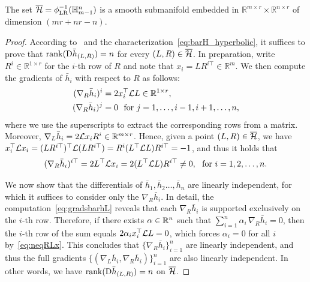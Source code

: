 \begin{proposition}\label{pro:manifold_hyperbolic}
     The set $\overline{\mathcal{H}} = \phi_{\mathrm{LR}}^{-1}(\mathbb{H}^n_{m-1})$ is a smooth submanifold embedded in $\mathbb{R}^{m\times r}\times\mathbb{R}^{n\times r}$ of dimension $(mr+nr-n)$.
\end{proposition}
\begin{proof}
    According to~\cite[Corollary 5.14]{lee2012manifolds} and the characterization~\eqref{eq:barH_hyperbolic}, it suffices to prove that $\operatorname{rank}(\mathrm{D}\bar{h}_{(L,R)})=n$ for every $(L,R)\in\overline{\mathcal{H}}$. In preparation, write $R^i\in\mathbb{R}^{1\times r}$ for the $i$-th row of $R$ and note that $x_i=LR^{i\top}\in\mathbb{R}^m$. We then compute the gradients of $\bar{h}_i$ with respect to $R$ as follows:
    \begin{equation}\label{eq:gradsbarhL}
    \begin{aligned}
        (\nabla_R \bar{h}_i)^{i}&= 2x_i^\top \lanifold L \in\mathbb{R}^{1\times r}, 
        \\
        (\nabla_R \bar{h}_i)^{j} &= 0\ \ \text{for}\ j=1,\ldots,i-1,i+1,\ldots,n,
    \end{aligned}
    \end{equation}
    where we use the superscripts to extract the corresponding rows from a matrix. Moreover, $\nabla_L \bar{h}_i = 2\mathcal{L} x_i R^i \in \mathbb{R}^{m\times r}$. Hence, given a point $(L,R)\in\overline{\mathcal{H}}$, we have $x_i^\top \mathcal{L} x_i
    = (LR^{i\top})^\top \mathcal{L} (LR^{i\top})
    = R^i(L^\top \mathcal{L} L) R^{i\top}
    = -1$, and thus it holds that 
    \begin{equation}\label{eq:neqRLx}
    (\nabla_R \bar{h}_i)^{i\top} = 2L^\top \mathcal{L} x_i= 2(L^\top \mathcal{L} L)R^{i\top}\neq 0,\ \ \text{for}\ i=1,2,\ldots,n.
    \end{equation}

    We now show that the differentials of $\bar{h}_1,\bar{h}_2\dots,\bar{h}_n$ are linearly independent, for which it suffices to consider only the $\nabla_R \bar{h}_i$. In detail, the computation~\eqref{eq:gradsbarhL} reveals that each $\nabla_R \bar{h}_i$ is supported exclusively on the $i$-th row. Therefore, if there exists $\alpha\in\mathbb{R}^n$ such that $\sum_{i=1}^n\alpha_i\,\nabla_R \bar{h}_i=0$, then the $i$-th row of the sum equals $2\alpha_i x_i^\top \mathcal{L} L=0$, which forces $\alpha_i=0$ for all $i$ by~\eqref{eq:neqRLx}. This concludes that $\{\nabla_R \bar{h}_i\}_{i=1}^n$ are linearly independent, and thus the full gradients $\{(\nabla_L \bar{h}_i,\nabla_R \bar{h}_i)\}_{i=1}^n$ are also linearly independent. In other words, we have $\operatorname{rank}(\mathrm{D}\bar{h}_{(L,R)})=n$ on $\overline{\mathcal{H}}$.
\end{proof}

